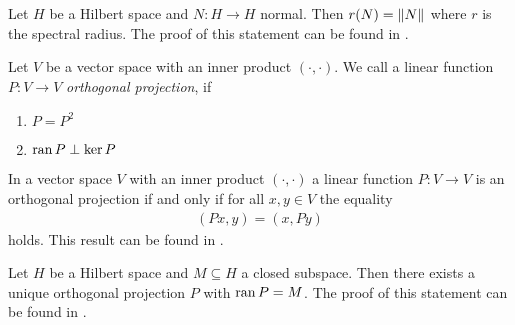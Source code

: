 \begin{remark} \label{remark:spectral_radius}
	Let $H$ be a Hilbert space and $N: H \to H$ normal. Then $r(N) = {\left \| N \right \|}_{}$ where $r$ is the spectral radius. The proof of this statement can be found in \cite[p.142]{FAna1}.
\end{remark}


\begin{definition}
	Let $V$ be a vector space with an inner product $(\cdot, \cdot)$. We call a linear function $P: V \to V$ \textit{orthogonal projection}, if
	\begin{enumerate}
		\item $P = P^2$
		\item $\operatorname{ran} P \perp \ker P$
	\end{enumerate}
\end{definition}


\begin{remark}
	In a vector space $V$ with an inner product $(\cdot, \cdot)$ a linear function $P: V \to V$ is an orthogonal projection if and only if for all $x,y \in V$ the equality
	\begin{align*}
		(Px, y) = (x,Py)
	\end{align*}
	holds. This result can be found in \cite[p. 47]{FAna1}.
\end{remark}


\begin{remark} \label{remark:orth_proj_uniqueness}
	Let $H$ be a Hilbert space and $M \subseteq H$ a closed subspace. Then there exists a unique orthogonal projection $P$ with $\operatorname{ran} P = M$. The proof of this statement can be found in \cite[p. 48]{FAna1}.
\end{remark}